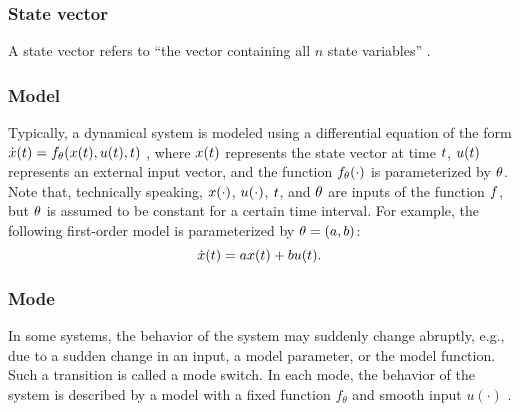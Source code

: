 \subsubsection{State vector}
\label{sec:state vector}
A state vector refers to ``the vector containing all $n$ state variables'' \autocite[p.~233]{dorf2011modern}.

\subsubsection{Model}
\label{sec:model}
Typically, a dynamical system is modeled using a differential equation of the form $\dot{x}(t)=f_{\theta}(x(t), u(t), t)$ \autocite{norman2011control}, where $x(t)$ represents the state vector at time $t$, $u(t)$ represents an external input vector, and the function $f_{\theta}(\cdot)$ is parameterized by $\theta$.  Note that, technically speaking, $x(\cdot)$, $u(\cdot)$, $t$, and $\theta$ are inputs of the function $f$, but $\theta$ is assumed to be constant for a certain time interval. For example, the following first-order model is parameterized by $\theta=(a,b)$:
\begin{equation}
	\dot{x}(t) = a x(t) + b u(t).
\end{equation}


\subsubsection{Mode}
\label{sec:mode}
In some systems, the behavior of the system may suddenly change abruptly, e.g., due to a sudden change in an input, a model parameter, or the model function. Such a transition is called a mode switch.
In each mode, the behavior of the system is described by a model with a fixed function $f_{\theta}$ and smooth input $u(\cdot)$ \autocite{deschutter2000optimal}.

